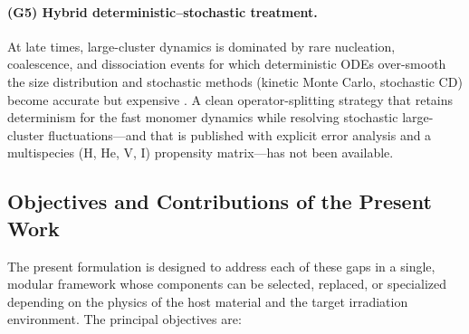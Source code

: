 \documentclass[sn-mathphys-ay,Numbered]{sn-jnl}
\begin{document}
\paragraph{(G5) Hybrid deterministic--stochastic treatment.}
At late times, large-cluster dynamics is dominated by rare
nucleation, coalescence, and dissociation events for which
deterministic ODEs over-smooth the size distribution and stochastic
methods (kinetic Monte Carlo, stochastic CD) become accurate but
expensive \citep{MarianBulatov2011,Stewart2010,Surh2004,Wirth2002}.
A clean operator-splitting strategy that retains determinism for the
fast monomer dynamics while resolving stochastic large-cluster
fluctuations---and that is published with explicit error analysis
and a multispecies (H, He, V, I) propensity matrix---has not been
available.

\subsection*{Objectives and Contributions of the Present Work}

The present formulation is designed to address each of these gaps in a
single, modular framework whose components can be selected, replaced,
or specialized depending on the physics of the host material and the
target irradiation environment. The principal objectives are:
\end{document}
